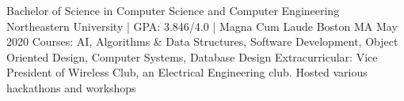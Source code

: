

\begin{cventries}

  \cventry
    {Bachelor of Science in Computer Science and Computer Engineering} %
    {Northeastern University | GPA: 3.846/4.0 | Magna Cum Laude} %
    {Boston MA} %
    {May 2020} %
    {
      Courses: AI, Algorithms \& Data Structures, Software Development, Object Oriented Design, Computer Systems, Database Design
      Extracurricular: Vice President of Wireless Club, an Electrical Engineering club. Hosted various hackathons and workshops
    }

\end{cventries}
